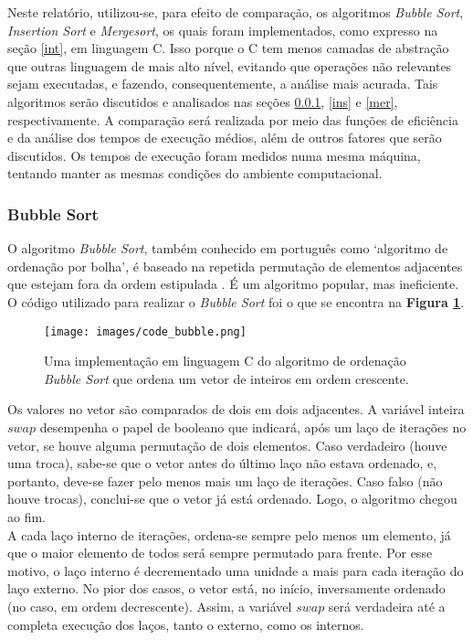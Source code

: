\documentclass[fontsize=10pt]{article}
\begin{document}
Neste relatório, utilizou-se, para efeito de comparação, os algoritmos \textit{Bubble Sort}, \textit{Insertion Sort} e \textit{Mergesort}, os quais foram implementados, como expresso na seção \ref{int}, em linguagem C. Isso porque o C tem menos camadas de abstração que outras linguagem de mais alto nível, evitando que operações não relevantes sejam executadas, e fazendo, consequentemente, a análise mais acurada. Tais algoritmos serão discutidos e analisados nas seções \ref{bub}, \ref{ins} e \ref{mer}, respectivamente. A comparação será realizada por meio das funções de eficiência e da análise dos tempos de execução médios, além de outros fatores que serão discutidos. Os tempos de execução foram medidos numa mesma máquina, tentando manter as mesmas condições do ambiente computacional.


\subsubsection{Bubble Sort}
\label{bub}
O algoritmo \textit{Bubble Sort}, também conhecido em português como `algoritmo de ordenação por bolha', é baseado na repetida permutação de elementos adjacentes que estejam fora da ordem estipulada \cite[p. 43]{cormen}. É um algoritmo popular, mas ineficiente. O código utilizado para realizar o \textit{Bubble Sort} foi o que se encontra na \textbf{Figura \ref{bubble-code}}.

\begin{figure}[h]
\centering
\texttt{[image: images/code\_bubble.png]}
\caption{Uma implementação em linguagem C do algoritmo de ordenação \textit{Bubble Sort} que ordena um vetor de inteiros em ordem crescente.}
\label{bubble-code}
\end{figure}

Os valores no vetor são comparados de dois em dois adjacentes. A variável inteira $swap$ desempenha o papel de booleano que indicará, após um laço de iterações no vetor, se houve alguma permutação de dois elementos. Caso verdadeiro (houve uma troca), sabe-se que o vetor antes do último laço não estava ordenado, e, portanto, deve-se fazer pelo menos mais um laço de iterações. Caso falso (não houve trocas), conclui-se que o vetor já está ordenado. Logo, o algoritmo chegou ao fim.\\

A cada laço interno de iterações, ordena-se sempre pelo menos um elemento, já que o maior elemento de todos será sempre permutado para frente. Por esse motivo, o laço interno é decrementado uma unidade a mais para cada iteração do laço externo. No pior dos casos, o vetor está, no início, inversamente ordenado (no caso, em ordem decrescente). Assim, a variável $swap$ será verdadeira até a completa execução dos laços, tanto o externo, como os internos.\\
\end{document}
